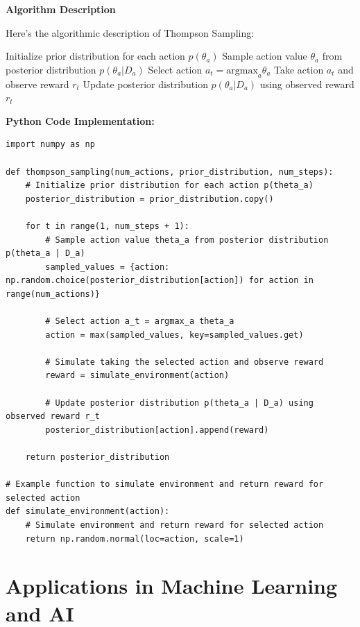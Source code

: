 \documentclass[12pt]{book} %
\begin{document}
\textbf{Algorithm Description}

Here's the algorithmic description of Thompson Sampling:
\FloatBarrier
\begin{algorithm}
\caption{Thompson Sampling}\label{alg:thompson_sampling}
\begin{algorithmic}[1]
\State Initialize prior distribution for each action \(p(\theta_a)\)
        \State Sample action value \(\theta_a\) from posterior distribution \(p(\theta_a | D_a)\)
    \EndFor
    \State Select action \(a_t = \text{argmax}_{a} \theta_a\)
    \State Take action \(a_t\) and observe reward \(r_t\)
    \State Update posterior distribution \(p(\theta_a | D_a)\) using observed reward \(r_t\)
\EndFor
\end{algorithmic}
\end{algorithm}
\FloatBarrier
\textbf{Python Code Implementation:}
\FloatBarrier
\begin{lstlisting}
import numpy as np

def thompson_sampling(num_actions, prior_distribution, num_steps):
    # Initialize prior distribution for each action p(theta_a)
    posterior_distribution = prior_distribution.copy()

    for t in range(1, num_steps + 1):
        # Sample action value theta_a from posterior distribution p(theta_a | D_a)
        sampled_values = {action: np.random.choice(posterior_distribution[action]) for action in range(num_actions)}

        # Select action a_t = argmax_a theta_a
        action = max(sampled_values, key=sampled_values.get)

        # Simulate taking the selected action and observe reward
        reward = simulate_environment(action)

        # Update posterior distribution p(theta_a | D_a) using observed reward r_t
        posterior_distribution[action].append(reward)

    return posterior_distribution

# Example function to simulate environment and return reward for selected action
def simulate_environment(action):
    # Simulate environment and return reward for selected action
    return np.random.normal(loc=action, scale=1)
\end{lstlisting}


\section{Applications in Machine Learning and AI}
\end{document}
